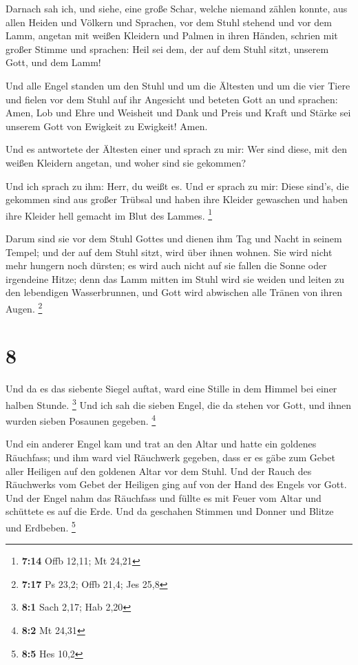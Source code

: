  Darnach sah ich, und siehe, eine große Schar, welche
niemand zählen konnte, aus allen Heiden und Völkern und Sprachen, vor
dem Stuhl stehend und vor dem Lamm, angetan mit weißen Kleidern und
Palmen in ihren Händen,  schrien mit großer Stimme und
sprachen: Heil sei dem, der auf dem Stuhl sitzt, unserem Gott, und dem
Lamm!

 Und alle Engel standen um den Stuhl und um die Ältesten
und um die vier Tiere und fielen vor dem Stuhl auf ihr Angesicht und
beteten Gott an  und sprachen: Amen, Lob und Ehre und
Weisheit und Dank und Preis und Kraft und Stärke sei unserem Gott von
Ewigkeit zu Ewigkeit! Amen.

 Und es antwortete der Ältesten einer und sprach zu mir:
Wer sind diese, mit den weißen Kleidern angetan, und woher sind sie
gekommen?

 Und ich sprach zu ihm: Herr, du weißt es. Und er sprach
zu mir: Diese sind's, die gekommen sind aus großer Trübsal und haben
ihre Kleider gewaschen und haben ihre Kleider hell gemacht im Blut des
Lammes. \footnote{\textbf{7:14} Offb 12,11; Mt 24,21}

 Darum sind sie vor dem Stuhl Gottes und dienen ihm Tag
und Nacht in seinem Tempel; und der auf dem Stuhl sitzt, wird über ihnen
wohnen.  Sie wird nicht mehr hungern noch dürsten; es
wird auch nicht auf sie fallen die Sonne oder irgendeine Hitze;
 denn das Lamm mitten im Stuhl wird sie weiden und leiten
zu den lebendigen Wasserbrunnen, und Gott wird abwischen alle Tränen von
ihren Augen. \footnote{\textbf{7:17} Ps 23,2; Offb 21,4; Jes 25,8}

\hypertarget{section-2}{%
\section{8}\label{section-2}}

 Und da es das siebente Siegel auftat, ward eine Stille in
dem Himmel bei einer halben Stunde. \footnote{\textbf{8:1} Sach 2,17;
  Hab 2,20}  Und ich sah die sieben Engel, die da stehen
vor Gott, und ihnen wurden sieben Posaunen gegeben. \footnote{\textbf{8:2}
  Mt 24,31}

 Und ein anderer Engel kam und trat an den Altar und hatte
ein goldenes Räuchfass; und ihm ward viel Räuchwerk gegeben, dass er es
gäbe zum Gebet aller Heiligen auf den goldenen Altar vor dem Stuhl.
 Und der Rauch des Räuchwerks vom Gebet der Heiligen ging
auf von der Hand des Engels vor Gott.  Und der Engel nahm
das Räuchfass und füllte es mit Feuer vom Altar und schüttete es auf die
Erde. Und da geschahen Stimmen und Donner und Blitze und Erdbeben.
\footnote{\textbf{8:5} Hes 10,2}

